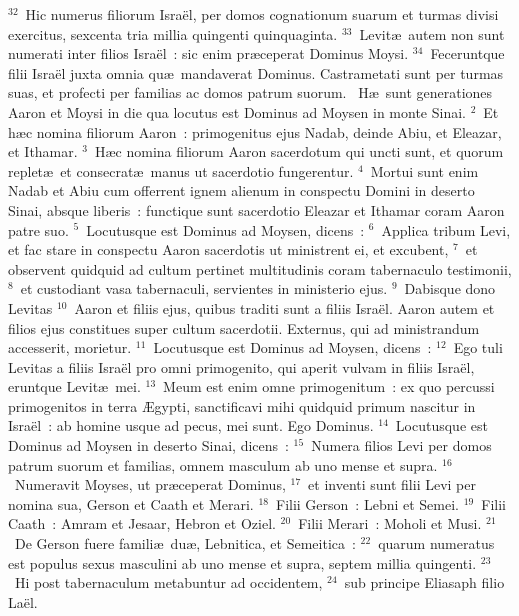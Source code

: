 ${}^{32}$~Hic numerus filiorum Isra\"el, per domos cognationum suarum et turmas divisi exercitus, sexcenta tria millia quingenti quinquaginta.
${}^{33}$~Levit\ae\ autem non sunt numerati inter filios Isra\"el~: sic enim pr\ae ceperat Dominus Moysi.
${}^{34}$~Feceruntque filii Isra\"el juxta omnia qu\ae\ mandaverat Dominus. Castrametati sunt per turmas suas, et profecti per familias ac domos patrum suorum.
~H\ae\ sunt generationes Aaron et Moysi in die qua locutus est Dominus ad Moysen in monte Sinai.
${}^{2}$~Et h\ae c nomina filiorum Aaron~: primogenitus ejus Nadab, deinde Abiu, et Eleazar, et Ithamar.
${}^{3}$~H\ae c nomina filiorum Aaron sacerdotum qui uncti sunt, et quorum replet\ae\ et consecrat\ae\ manus ut sacerdotio fungerentur.
${}^{4}$~Mortui sunt enim Nadab et Abiu cum offerrent ignem alienum in conspectu Domini in deserto Sinai, absque liberis~: functique sunt sacerdotio Eleazar et Ithamar coram Aaron patre suo.
${}^{5}$~Locutusque est Dominus ad Moysen, dicens~:
${}^{6}$~Applica tribum Levi, et fac stare in conspectu Aaron sacerdotis ut ministrent ei, et excubent,
${}^{7}$~et observent quidquid ad cultum pertinet multitudinis coram tabernaculo testimonii,
${}^{8}$~et custodiant vasa tabernaculi, servientes in ministerio ejus.
${}^{9}$~Dabisque dono Levitas
${}^{10}$~Aaron et filiis ejus, quibus traditi sunt a filiis Isra\"el. Aaron autem et filios ejus constitues super cultum sacerdotii. Externus, qui ad ministrandum accesserit, morietur.
${}^{11}$~Locutusque est Dominus ad Moysen, dicens~:
${}^{12}$~Ego tuli Levitas a filiis Isra\"el pro omni primogenito, qui aperit vulvam in filiis Isra\"el, eruntque Levit\ae\ mei.
${}^{13}$~Meum est enim omne primogenitum~: ex quo percussi primogenitos in terra \AE gypti, sanctificavi mihi quidquid primum nascitur in Isra\"el~: ab homine usque ad pecus, mei sunt. Ego Dominus.
${}^{14}$~Locutusque est Dominus ad Moysen in deserto Sinai, dicens~:
${}^{15}$~Numera filios Levi per domos patrum suorum et familias, omnem masculum ab uno mense et supra.
${}^{16}$~Numeravit Moyses, ut pr\ae ceperat Dominus,
${}^{17}$~et inventi sunt filii Levi per nomina sua, Gerson et Caath et Merari.
${}^{18}$~Filii Gerson~: Lebni et Semei.
${}^{19}$~Filii Caath~: Amram et Jesaar, Hebron et Oziel.
${}^{20}$~Filii Merari~: Moholi et Musi.
${}^{21}$~De Gerson fuere famili\ae\ du\ae , Lebnitica, et Semeitica~:
${}^{22}$~quarum numeratus est populus sexus masculini ab uno mense et supra, septem millia quingenti.
${}^{23}$~Hi post tabernaculum metabuntur ad occidentem,
${}^{24}$~sub principe Eliasaph filio La\"el.
